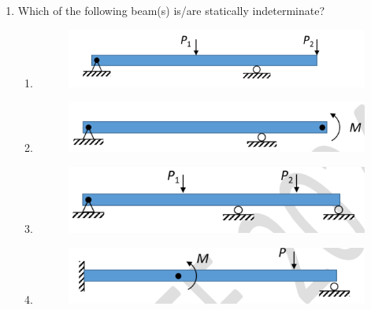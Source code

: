\documentclass[journal]{IEEEtran}
\begin{document}
\begin{enumerate}[leftmargin=0pt]
\vspace{2mm}

\begin{enumerate}
\end{enumerate}

\hfill{}

\vspace{4mm}

\item
Which of the following beam(s) is/are statically indeterminate?

\vspace{2mm}

\begin{enumerate}
\item
\begin{figure}[h]
\includegraphics[width=0.42\columnwidth]{Figs/image (72).png}
\caption*{}
\label{fig:a}
\end{figure}
\item
\begin{figure}[h]
\includegraphics[width=0.42\columnwidth]{Figs/image (73).png}
\caption*{}
\label{fig:b}
\end{figure}
\item
\begin{figure}[h]
\includegraphics[width=0.42\columnwidth]{Figs/image (74).png}
\caption*{}
\label{fig:c}
\end{figure}
\item
\begin{figure}[h]
\includegraphics[width=0.42\columnwidth]{Figs/image (75).png}
\caption*{}
\label{fig:d}
\end{figure}
\end{enumerate}


\end{enumerate}
\end{document}
